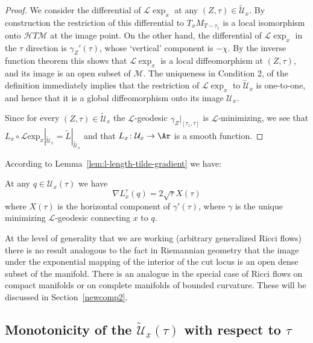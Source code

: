 \begin{proof}
\sketch
{}
We consider the differential of ${\mathcal L}\exp_x$ at any
 $(Z,\tau)\in\widetilde {\mathcal U}_x$. By construction
 the restriction of this differential to $T_xM_{T-\tau_1}$ is a local
 isomorphism onto ${\mathcal H}T{\mathcal M}$ at the image point. On the other
 hand, the differential of ${\mathcal L}\exp_x$ in the $\tau$
 direction is $\gamma_Z'(\tau)$, whose `vertical' component is
 $-\chi$. By the inverse function theorem this
 shows that ${\mathcal L}\exp_x$ is a local diffeomorphism at
 $(Z,\tau)$, and
 its image is an open subset of ${\mathcal M}$.
The uniqueness in Condition 2, of the definition immediately implies
that the restriction of ${\mathcal L}\exp_x$ to
$\widetilde{\mathcal U}_x$ is one-to-one, and hence that it is a
global diffeomorphism onto its image ${\mathcal U}_x$.

Since for every $(Z,\tau)\in\widetilde{\mathcal U}_x$ the ${\mathcal
L}$-geodesic  $\gamma_Z|_{[\tau_1,\tau]}$ is ${\mathcal
L}$-minimizing, we see that $L_x\circ {\mathcal L}\mathrm{exp}_x|_{\widetilde{\mathcal U}_x}=\widetilde L|_{\widetilde
{\mathcal U}_x}$ and that $L_x\colon {\mathcal U}_x\to \Ar$ is a
smooth function.
\end{proof}

According to Lemma~\ref{lem:l-length-tilde-gradient} we have:

\begin{corollary}\label{cor:l-length-gradient}
\label{DL}
At any $q\in {\mathcal U}_x(\tau)$ we have
$$\nabla L_x^{\tau}(q)=2\sqrt{\tau}X(\tau)$$
where  $X(\tau)$ is the horizontal component of $\gamma'(\tau)$,
where $\gamma$ is the unique minimizing ${\mathcal L}$-geodesic
connecting $x$  to $q$.
\end{corollary}

At the level of generality that we are working (arbitrary
generalized Ricci flows) there is no result analogous to the fact in
Riemannian geometry that the image under the exponential mapping of
the interior of the cut locus is an open dense subset of the
manifold. There is an analogue in the special case of Ricci flows on
compact manifolds or on complete manifolds of bounded curvature.
These will be discussed in Section~\ref{newcomp2}.





\subsection{Monotonicity of the $\widetilde{\mathcal U}_x(\tau)$ with respect to
$\tau$}


